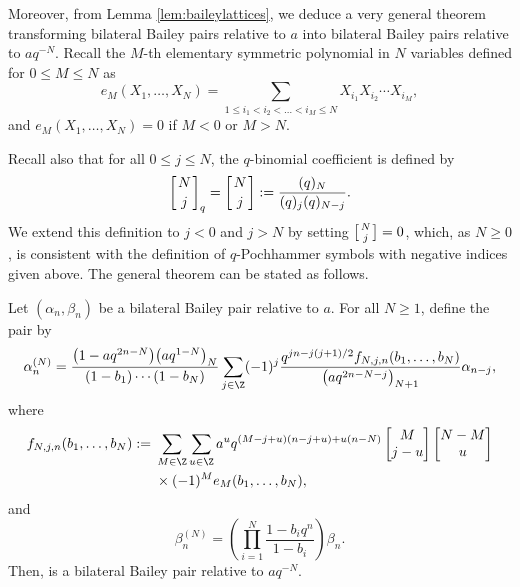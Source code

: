 Moreover, from Lemma \ref{lem:baileylattices}, we deduce a very general theorem transforming bilateral Bailey pairs relative to $a$ into bilateral Bailey pairs relative to $aq^{-N}$. Recall the $M$-th elementary symmetric polynomial in $N$ variables defined for $0 \leq M \leq N$ as
\begin{equation*}e_M(X_1, \dots , X_N)= \sum_{1\leq i_1<i_2<\dots<i_M\leq N} X_{i_1} X_{i_2}\cdots X_{i_M},
\end{equation*}
and $e_M(X_1, \dots , X_N)=0$ if $M<0$ or $M>N$.

Recall also that for all $0\leq j \leq N$, the $q$-binomial coefficient is defined by
\begin{equation*}\left[{N\atop j}\right]_q=\left[{N\atop j}\right]:=\frac{(q)_N}{(q)_j(q)_{N-j}}.
\end{equation*}
We extend this definition to $j<0$ and $j>N$ by setting $\bigl[{N\atop j}\bigr]=0$, which, as $N\geq0$, is consistent with the definition of $q$-Pochhammer symbols with negative indices given above.
The general theorem can be stated as follows.

\begin{Theorem}\label{thm:multibaileylattice}
Let $(\alpha_n, \beta_n)$ be a bilateral Bailey pair relative to $a$. For all $N\geq 1$, define the pair  by
\begin{equation}
\alpha^{(N)}_n=\frac{\bigl(1-aq^{2n-N}\bigr)\bigl(aq^{1-N}\bigr)_N}{(1-b_1)\cdots(1-b_N)}\sum_{j \in \Z}(-1)^j\frac{q^{jn-j(j+1)/2}f_{N,j,n}(b_1,\ldots,b_N)}{\bigl(aq^{2n-N-j}\bigr)_{N+1}} \alpha_{n-j},\label{eq:multibaileylatticealpha}
\end{equation}
where
\begin{align}
f_{N,j,n}(b_1,\ldots,b_N) :={}& \sum_{M \in \Z} \sum_{u \in \Z} a^{u}q^{(M-j+u)(n-j+u)+u(n-N)} \begin{bmatrix}
M\\
j-u
\end{bmatrix} \begin{bmatrix}
N-M\\
u
\end{bmatrix}\nonumber\\
&\times (-1)^Me_M(b_1, \dots , b_N),\label{eq:pascalab}
\end{align}
and
\begin{equation}
\beta^{(N)}_n=\left(\prod_{i=1}^N \frac{1-b_iq^n}{1-b_i}\right)\beta_n.\label{eq:multibaileylatticebeta}
\end{equation}
Then,  is a bilateral Bailey pair relative to $aq^{-N}$.
\end{Theorem}

